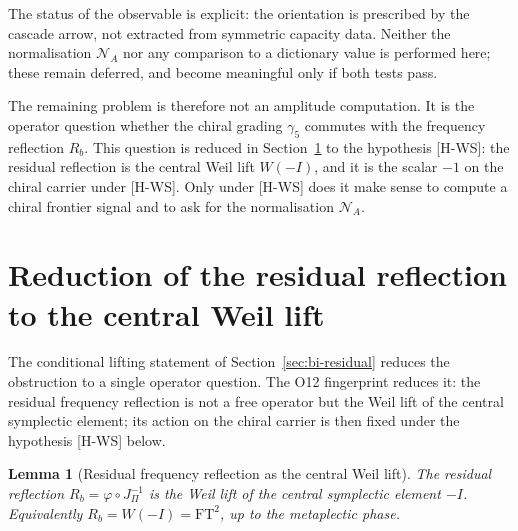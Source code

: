 \documentclass[11pt]{article}
\newtheorem{lemma}{Lemma}
\begin{document}
    The status of the observable is explicit: the orientation is prescribed by the cascade arrow, not
    extracted from symmetric capacity data.
    Neither the normalisation $\mathcal{N}_A$ nor any comparison to a dictionary value is performed here;
    these remain deferred, and become meaningful only if both tests pass.

    The remaining problem is therefore not an amplitude computation.
    It is the operator question whether the chiral grading $\gamma_5$ commutes with the
    frequency reflection $R_b$.
    This question is reduced in Section~\ref{sec:residual-resolution} to the hypothesis [H-WS]: the residual
    reflection is the central Weil lift $W(-I)$, and it is the scalar $-1$ on the chiral carrier under [H-WS].
    Only under [H-WS] does it make sense to compute a chiral frontier signal and to ask for
    the normalisation $\mathcal{N}_A$.


  \section{Reduction of the residual reflection to the central Weil lift}
    \label{sec:residual-resolution}

    The conditional lifting statement of Section~\ref{sec:bi-residual} reduces the obstruction to a
    single operator question.
    The O12 fingerprint reduces it: the residual frequency reflection is not a free operator but the
    Weil lift of the central symplectic element; its action on the chiral carrier is then fixed under the
    hypothesis [H-WS] below.

    \begin{lemma}[Residual frequency reflection as the central Weil lift]
      \label{lem:rb-central-weil-lift}
      The residual reflection $R_b=\varphi\circ J_\Pi^{-1}$ is the Weil lift of the central symplectic
      element $-I$.
      Equivalently $R_b=W(-I)=\mathrm{FT}^2$, up to the metaplectic phase.
    \end{lemma}
\end{document}
